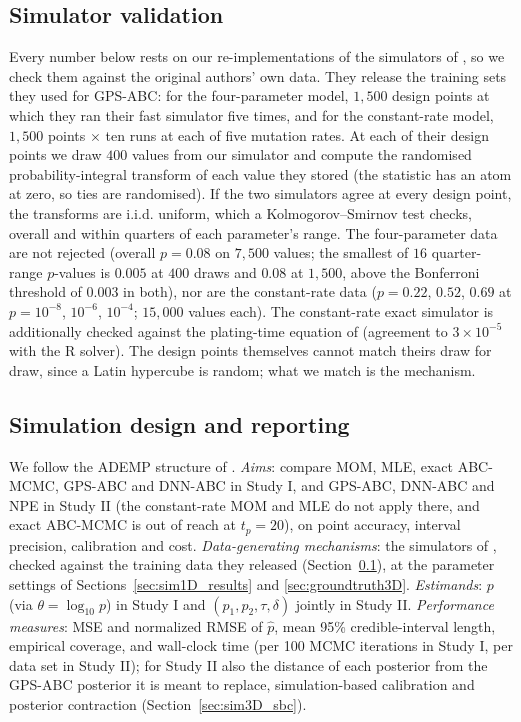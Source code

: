 \documentclass[sn-basic,iicol,pdflatex]{sn-jnl}
\begin{document}
\subsection{Simulator validation}
\label{sec:validation}

Every number below rests on our re-implementations of the simulators of
\citet{lu2023}, so we check them against the original authors' own data. They
release the training sets they used for GPS-ABC: for the four-parameter model,
$1{,}500$ design points at which they ran their fast simulator five times, and
for the constant-rate model, $1{,}500$ points $\times$ ten runs at each of five
mutation rates. At each of their design points we draw $400$ values from our
simulator and compute the randomised probability-integral transform of each
value they stored (the statistic has an atom at zero, so ties are randomised).
If the two simulators agree at every design point, the transforms are i.i.d.
uniform, which a Kolmogorov--Smirnov test checks, overall and within quarters of
each parameter's range. The four-parameter data are not rejected
(overall $p=0.08$ on $7{,}500$ values; the smallest of $16$ quarter-range
$p$-values is $0.005$ at $400$ draws and $0.08$ at $1{,}500$, above the
Bonferroni threshold of $0.003$ in both), nor are the constant-rate data
($p=0.22$, $0.52$, $0.69$ at $p=10^{-8}$, $10^{-6}$, $10^{-4}$; $15{,}000$ values
each). The constant-rate exact simulator is additionally checked against the plating-time
equation of \citet{lu2023} (agreement to $3\times10^{-5}$ with the R solver). The
design points themselves cannot match theirs draw for draw, since a Latin hypercube
is random; what we match is the mechanism.

\subsection{Simulation design and reporting}
\label{sec:ademp}

We follow the ADEMP structure of \citet{morris2019}. \emph{Aims}: compare MOM,
MLE, exact ABC-MCMC, GPS-ABC and DNN-ABC in Study I, and GPS-ABC, DNN-ABC and NPE in
Study II (the constant-rate MOM and MLE do not apply there, and exact ABC-MCMC is out
of reach at $t_p=20$), on point accuracy, interval precision, calibration and cost.
\emph{Data-generating mechanisms}: the simulators of \citet{lu2023}, checked against
the training data they released (Section~\ref{sec:validation}), at the parameter
settings of Sections~\ref{sec:sim1D_results} and \ref{sec:groundtruth3D}.
\emph{Estimands}: $p$ (via $\theta=\log_{10}p$) in Study I and
$(p_1,p_2,\tau,\delta)$ jointly in Study II. \emph{Performance measures}: MSE and
normalized RMSE of $\hat p$, mean 95\% credible-interval length, empirical coverage, and
wall-clock time (per 100 MCMC iterations in Study I, per data set in Study II); for
Study II also the distance of each posterior from the GPS-ABC posterior it is meant to
replace, simulation-based calibration and posterior contraction
(Section~\ref{sec:sim3D_sbc}).
\end{document}
